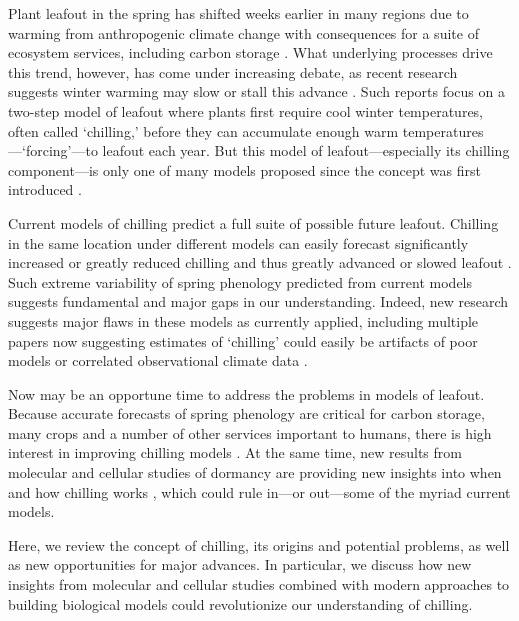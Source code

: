 \documentclass[11pt]{article}
\begin{document}
Plant leafout in the spring has shifted weeks earlier in many regions due to warming from anthropogenic climate change with consequences for a suite of ecosystem services, including carbon storage \citep{keenan2014net,ipcc2022}.  What underlying processes drive this trend, however, has come under increasing debate, as recent research suggests winter warming may slow or stall this advance \citep{fu2015,piao2017}. Such reports focus on a two-step model of leafout where plants first require cool winter temperatures, often called `chilling,' before they can accumulate enough warm temperatures---`forcing'---to leafout each year. But this model of leafout---especially its chilling component---is only one of many models proposed since the concept was first introduced \citep[at least 30 models are used today, see][]{basler2016evaluating,hufkens2018integrated}. 

Current models of chilling predict a full suite of possible future leafout. Chilling in the same location under different models can easily forecast significantly increased or greatly reduced chilling and thus greatly advanced or slowed leafout \citep{guy2014,chuine2016}. Such extreme variability of spring phenology predicted from current models suggests fundamental and major gaps in our understanding. Indeed, new research suggests major flaws in these models as currently applied, including multiple papers now suggesting estimates of `chilling' could easily be artifacts of poor models or correlated observational climate data \citep{decsens,gao2024}. 

Now may be an opportune time to address the problems in models of leafout. Because accurate forecasts of spring phenology are critical for carbon storage, many crops and a number of other services important to humans, there is high interest in improving chilling models \citep{Luedeling2015Acta,chuine2016}. At the same time, new results from molecular and cellular studies of dormancy are providing new insights into when and how chilling works \citep{pan2023epigenetic,zhu2021cold}, which could rule in---or out---some of the myriad current models. 

Here, we review the concept of chilling, its origins and potential problems, as well as new opportunities for major advances. In particular, we discuss how new insights from molecular and cellular studies combined with modern approaches to building biological models could revolutionize our understanding of chilling. 
\end{document}

